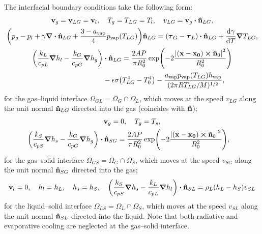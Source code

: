\documentclass{article}
\newcommand{\evapor}[1]{{#1}_\mathrm{vap}}
\newcommand{\bv}{\vb{v}}
\newcommand{\bn}{\vu{n}}
\newcommand{\btau}{\vb*\tau}
\begin{document}
The interfacial boundary conditions take the following form:
\begin{gather}
    \bv_g = \bv_{LG} = \bv_l, \quad T_g = T_{LG} = T_l, \quad v_{LG} = \bv_g\vdot\bn_{LG}, \\
    \qty(p_g - p_l + \gamma\div\bn_{LG} + \frac{3-\evapor{a}}4\evapor{p}(T_{LG}))\bn_{LG}
    = (\btau_G - \btau_L)\vdot\bn_{LG} + \dv{\gamma}{T}\grad{T_{LG}}, \\
    \begin{aligned}
    \qty( \frac{k_L}{c_{pL}}\grad{h}_l - \frac{k_G}{c_{pG}}\grad{h}_g )&\vdot\bn_{LG}
        = \frac{2AP}{\pi R_0^2}\exp(-2\frac{\abs{(\vb{x}-\vb{x_0})\cp\bn_0}^2}{R_0^2}) \\
        &- \epsilon\sigma\qty(T_{LG}^4-T_0^4)
        - \frac{\evapor{a}\evapor{p}(T_{LG})\evapor{h}}{(2\pi RT_{LG}/M)^{1/2}},
    \end{aligned}
\end{gather}
for the gas--liquid interface $\Omega_{GL} = \Omega_G\cap\Omega_L$,
which moves at the speed $v_{LG}$ along the unit normal $\bn_{LG}$ directed into the gas (coincides with $\bn$);
\begin{gather}
    \bv_g = 0, \quad T_g = T_s, \\
    \begin{aligned}
    \qty( \frac{k_S}{c_{pS}}\grad{h}_s - \frac{k_G}{c_{pG}}\grad{h}_g )&\vdot\bn_{SG}
        = \frac{2AP}{\pi R_0^2}\exp(-2\frac{\abs{(\vb{x}-\vb{x_0})\cp\bn_0}^2}{R_0^2}),
    \end{aligned}
\end{gather}
for the gas--solid interface $\Omega_{GS} = \Omega_G\cap\Omega_S$,
which moves at the speed $v_{SG}$ along the unit normal $\bn_{SG}$ directed into the gas; \begin{equation}
    \bv_l = 0, \quad h_l = h_L, \quad h_s = h_S, \quad
    \qty( \frac{k_S}{c_{pS}}\grad{h}_s - \frac{k_L}{c_{pL}}\grad{h}_l )\vdot\bn_{SL}
        = \rho_L(h_L - h_S)v_{SL}
\end{equation}
for the liquid--solid interface $\Omega_{LS} = \Omega_L\cap\Omega_S$,
which moves at the speed $v_{SL}$ along the unit normal $\bn_{SL}$ directed into the liquid. 
Note that both radiative and evaporative cooling are neglected at the gas--solid interface.

\printbibliography
\end{document}

